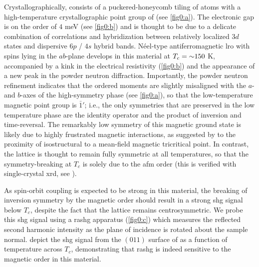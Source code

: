 Crystallographically, \cmb consists of a puckered-honeycomb tiling of  atoms with a high-temperature crystallographic point group of \htpg (see \cref{fig0:a}).
The electronic gap is on the order of $4$ \si{meV} (see \cref{fig0:b}) and is thought to be due to a delicate combination of correlations and hybridization between relatively localized  $3d$ states and dispersive  $6p$ /  $4s$ hybrid bands\citep{gibson_magnetic_2015, piva_putative_2019, lane_competition_2019}.
N\'{e}el-type antiferromagnetic \gls{lro} with spins lying in the $ab$-plane develops in this material at $T_c={\sim}150$ \si{K}, accompanied by a kink in the electrical resistivity (\cref{fig0:b}) and the appearance of a new peak in the powder neutron diffraction\citep{gibson_magnetic_2015}.
Importantly, the powder neutron refinement indicates that the ordered moments are slightly misaligned with the $a$- and $b$-axes of the high-symmetry phase (see \cref{fig0:a}), so that the low-temperature magnetic point group is $\bar{1}'$; i.e., the only symmetries that are preserved in the low temperature phase are the identity operator and the product of inversion and time-reversal\citep{gibson_magnetic_2015}.
The remarkably low symmetry of this magnetic ground state is likely due to highly frustrated magnetic interactions, as suggested by to the proximity of isostructural  to a mean-field magnetic tricritical point\citep{mazin_camn2sb2_2013,mcnally_camn2sb2_2015}.
In contrast, the lattice is thought to remain fully symmetric at all temperatures, so that the symmetry-breaking at $T_c$ is solely due to the \gls{afm} order (this is verified with single-crystal \gls{xrd}, see ).

As spin-orbit coupling is expected to be strong in this material, the breaking of inversion symmetry by the magnetic order should result in a strong \gls{shg} signal below $T_c$, despite the fact that the lattice remains centrosymmetric\citep{pan_optical_1989,seyler_spin-orbit-enhanced_2020}.
We probe this \gls{shg} signal using a \gls{rashg} apparatus (\cref{fig0:c}) which measures the reflected second harmonic intensity as the plane of incidence is rotated about the sample normal\citep{fichera_second_2020, harter_high-speed_2015, torchinsky_low_2014}.
 depict the \gls{shg} signal from the $(011)$ surface of \cmb as a function of temperature across $T_c$, demonstrating that \gls{rashg} is indeed sensitive to the magnetic order in this material.

